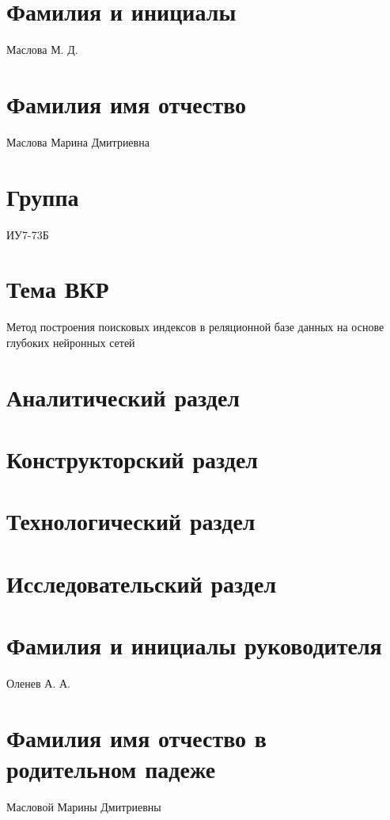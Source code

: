 \documentclass{bmstu}
\begin{document}
\section*{Фамилия и инициалы}

Маслова М. Д.

\section*{Фамилия имя отчество}

Маслова Марина Дмитриевна

\section*{Группа}

ИУ7-73Б

\section*{Тема ВКР}

Метод построения поисковых индексов в реляционной базе данных на основе глубоких
нейронных сетей

\section*{Аналитический раздел}

\section*{Конструкторский раздел}

\section*{Технологический раздел}

\section*{Исследовательский раздел}

\section*{Фамилия и инициалы руководителя}

Оленев А. А.

\section*{Фамилия имя отчество в родительном падеже}

Масловой Марины Дмитриевны
\end{document}
